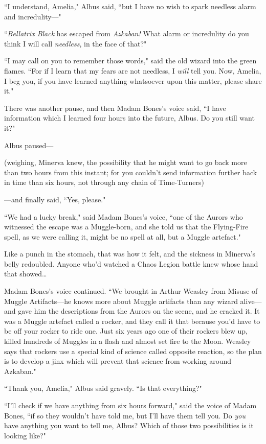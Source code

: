 ``I understand, Amelia," Albus said, ``but I have no wish to spark needless alarm and incredulity—"

``\emph{Bellatrix Black} has escaped from \emph{Azkaban!} What alarm or incredulity do you think I will call \emph{needless}, in the face of that?"

``I may call on you to remember those words," said the old wizard into the green flames. ``For if I learn that my fears are not needless, I \emph{will} tell you. Now, Amelia, I beg you, if you have learned anything whatsoever upon this matter, please share it."

There was another pause, and then Madam Bones's voice said, ``I have information which I learned four hours into the future, Albus. Do you still want it?"

Albus paused—

(weighing, Minerva knew, the possibility that he might want to go back more than two hours from this instant; for you couldn't send information further back in time than six hours, not through any chain of Time-Turners)

—and finally said, ``Yes, please."

``We had a lucky break," said Madam Bones's voice, ``one of the Aurors who witnessed the escape was a Muggle-born, and she told us that the Flying-Fire spell, as we were calling it, might be no spell at all, but a Muggle artefact."

Like a punch in the stomach, that was how it felt, and the sickness in Minerva's belly redoubled. Anyone who'd watched a Chaos Legion battle knew whose hand that showed…

Madam Bones's voice continued. ``We brought in Arthur Weasley from Misuse of Muggle Artifacts—he knows more about Muggle artifacts than any wizard alive—and gave him the descriptions from the Aurors on the scene, and he cracked it. It was a Muggle artefact called a rocker, and they call it that because you'd have to be off your rocker to ride one. Just six years ago one of their rockers blew up, killed hundreds of Muggles in a flash and almost set fire to the Moon. Weasley says that rockers use a special kind of science called opposite reaction, so the plan is to develop a jinx which will prevent that science from working around Azkaban."

``Thank you, Amelia," Albus said gravely. ``Is that everything?"

``I'll check if we have anything from six hours forward," said the voice of Madam Bones, ``if so they wouldn't have told me, but I'll have them tell you. Do \emph{you} have anything you want to tell me, Albus? Which of those two possibilities is it looking like?"

